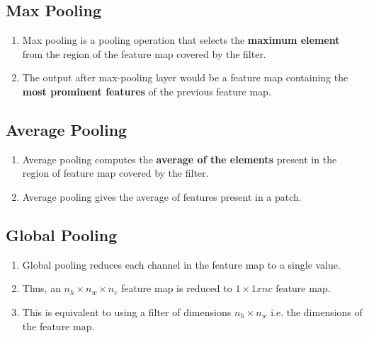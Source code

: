 \subsection{Max Pooling \cite{gfg-cnn-introduction-to-pooling-layer}}\label{cnn: Max Pooling}

\begin{enumerate}
    \item Max pooling is a pooling operation that selects the \textbf{maximum element} from the region of the feature map covered by the filter. 
    
    \item The output after max-pooling layer would be a feature map containing the \textbf{most prominent features} of the previous feature map.
\end{enumerate}


\subsection{Average Pooling \cite{gfg-cnn-introduction-to-pooling-layer}}\label{cnn: Average Pooling}
\begin{enumerate}
    \item Average pooling computes the \textbf{average of the elements} present in the region of feature map covered by the filter.
    
    \item Average pooling gives the average of features present in a patch.
\end{enumerate}


\subsection{Global Pooling \cite{gfg-cnn-introduction-to-pooling-layer}}\label{cnn: Global Pooling}
\begin{enumerate}
    \item Global pooling reduces each channel in the feature map to a single value.
    
    \item Thus, an $n_h \times n_w \times n_c$ feature map is reduced to $1 \times 1 x nc$ feature map. 

    \item This is equivalent to using a filter of dimensions $n_h \times n_w$ i.e. the dimensions of the feature map.
\end{enumerate}

